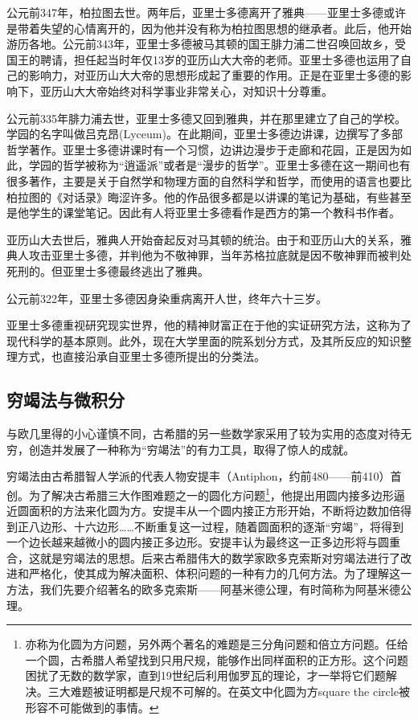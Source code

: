 \documentclass{article}
\begin{document}
公元前347年，柏拉图去世。两年后，亚里士多德离开了雅典——亚里士多德或许是带着失望的心情离开的，因为他并没有称为柏拉图思想的继承者。此后，他开始游历各地。公元前343年，亚里士多德被马其顿的国王腓力浦二世召唤回故乡，受国王的聘请，担任起当时年仅13岁的亚历山大大帝的老师。亚里士多德也运用了自己的影响力，对亚历山大大帝的思想形成起了重要的作用。正是在亚里士多德的影响下，亚历山大大帝始终对科学事业非常关心，对知识十分尊重。

公元前335年腓力浦去世，亚里士多德又回到雅典，并在那里建立了自己的学校。学园的名字叫做吕克昂(Lyceum)。在此期间，亚里士多德边讲课，边撰写了多部哲学著作。亚里士多德讲课时有一个习惯，边讲边漫步于走廊和花园，正是因为如此，学园的哲学被称为“逍遥派”或者是“漫步的哲学”。亚里士多德在这一期间也有很多著作，主要是关于自然学和物理方面的自然科学和哲学，而使用的语言也要比柏拉图的《对话录》晦涩许多。他的作品很多都是以讲课的笔记为基础，有些甚至是他学生的课堂笔记。因此有人将亚里士多德看作是西方的第一个教科书作者。

亚历山大去世后，雅典人开始奋起反对马其顿的统治。由于和亚历山大的关系，雅典人攻击亚里士多德，并判他为不敬神罪，当年苏格拉底就是因不敬神罪而被判处死刑的。但亚里士多德最终逃出了雅典。

公元前322年，亚里士多德因身染重病离开人世，终年六十三岁。

亚里士多德重视研究现实世界，他的精神财富正在于他的实证研究方法，这称为了现代科学的基本原则。此外，现在大学里面的院系划分方式，及其所反应的知识整理方式，也直接沿承自亚里士多德所提出的分类法。

\subsection{穷竭法与微积分}
与欧几里得的小心谨慎不同，古希腊的另一些数学家采用了较为实用的态度对待无穷，创造并发展了一种称为“穷竭法”的有力工具，取得了惊人的成就。

穷竭法由古希腊智人学派的代表人物安提丰（Antiphon，约前480——前410）首创。为了解决古希腊三大作图难题之一的圆化方问题\footnote{亦称为化圆为方问题，另外两个著名的难题是三分角问题和倍立方问题。任给一个圆，古希腊人希望找到只用尺规，能够作出同样面积的正方形。这个问题困扰了无数的数学家，直到19世纪后利用伽罗瓦的理论，才一举将它们题解决。三大难题被证明都是尺规不可解的。在英文中化圆为方square the circle被形容不可能做到的事情。}，他提出用圆内接多边形逼近圆面积的方法来化圆为方。安提丰从一个圆内接正方形开始，不断将边数加倍得到正八边形、十六边形……不断重复这一过程，随着圆面积的逐渐“穷竭”，将得到一个边长越来越微小的圆内接正多边形。安提丰认为最终这一正多边形将与圆重合，这就是穷竭法的思想。后来古希腊伟大的数学家欧多克索斯对穷竭法进行了改进和严格化，使其成为解决面积、体积问题的一种有力的几何方法。为了理解这一方法，我们先要介绍著名的欧多克索斯——阿基米德公理，有时简称为阿基米德公理。
\end{document}
